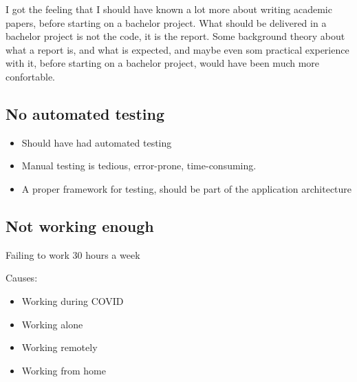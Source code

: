 I got the feeling that I should have known a lot more about writing academic papers, before starting on a bachelor project. What should be delivered in a bachelor project is not the code, it is the report. Some background theory about what a report is, and what is expected, and maybe even som practical experience with it, before starting on a bachelor project, would have been much more confortable.



\subsection{No automated testing}

\begin{itemize}
    \item Should have had automated testing
    \item Manual testing is tedious, error-prone, time-consuming.
    \item A proper framework for testing, should be part of the application architecture
\end{itemize}





\subsection{Not working enough}

\item Failing to work 30 hours a week

Causes:
\begin{itemize}
    \item Working during COVID
    \item Working alone
    \item Working remotely
    \item Working from home
\end{itemize}
